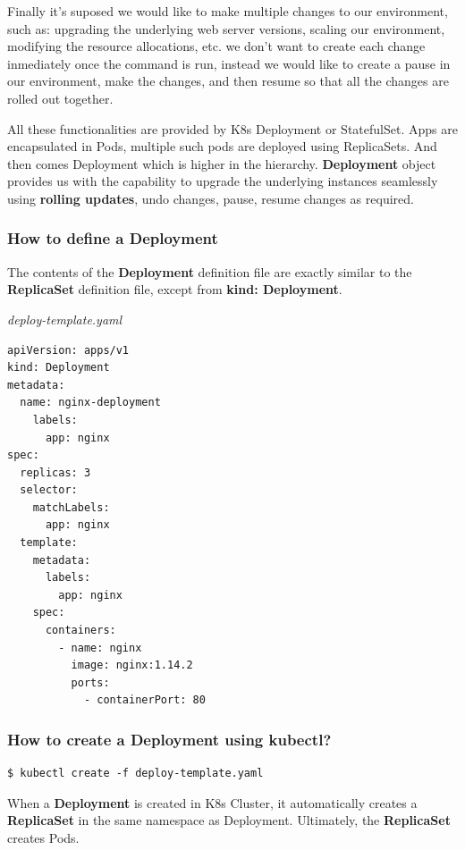 \documentclass{article}
\newenvironment{blocktemplateII}[1]{%
    \tcolorbox[beamer,%
    noparskip,breakable,
    colframe=Green,%
    colbacklower=LimeGreen!75!LightGreen,%
    title=#1]}%
    {\endtcolorbox}
\newenvironment{codetemplate}[1][]{%
  \mybasecolorbox[#1]
  \itshape
}{%
  \endmybasecolorbox
}
\begin{document}
Finally it's suposed we would like to make multiple changes to our environment, such as: upgrading the underlying web server versions, scaling our environment, modifying the resource allocations, etc. we don't want to create each change inmediately once the command is run, instead we would like to create a pause in our environment, make the changes, and then resume so that all the changes are rolled out together.

All these functionalities are provided by K8s Deployment or StatefulSet. Apps are encapsulated in Pods, multiple such pods are deployed using ReplicaSets. And then comes Deployment which is higher in the hierarchy. \textbf{Deployment} object provides us with the capability to upgrade the underlying instances seamlessly using \textbf{rolling updates}, undo changes, pause, resume changes as required.

\subsubsection{How to define a Deployment}

The contents of the \textbf{Deployment} definition file are exactly similar to the \textbf{ReplicaSet} definition file, except from \textbf{kind: Deployment}.

\begin{codetemplate}{deploy-template.yaml}
\begin{verbatim}
apiVersion: apps/v1
kind: Deployment
metadata:
  name: nginx-deployment
    labels:
      app: nginx
spec:
  replicas: 3
  selector:
    matchLabels:
      app: nginx
  template:
    metadata:
      labels:
        app: nginx
    spec:
      containers:
        - name: nginx
          image: nginx:1.14.2
          ports:
            - containerPort: 80    
\end{verbatim}
\end{codetemplate}

\subsubsection{How to create a Deployment using kubectl?}

\begin{codetemplate}{}
\begin{verbatim}
$ kubectl create -f deploy-template.yaml
\end{verbatim}
\end{codetemplate}

\begin{blocktemplateII}{NOTE}
When a \textbf{Deployment} is created in K8s Cluster, it automatically creates a \textbf{ReplicaSet} in the same namespace as Deployment. Ultimately, the \textbf{ReplicaSet} creates Pods.
\end{blocktemplateII}
\end{document}
